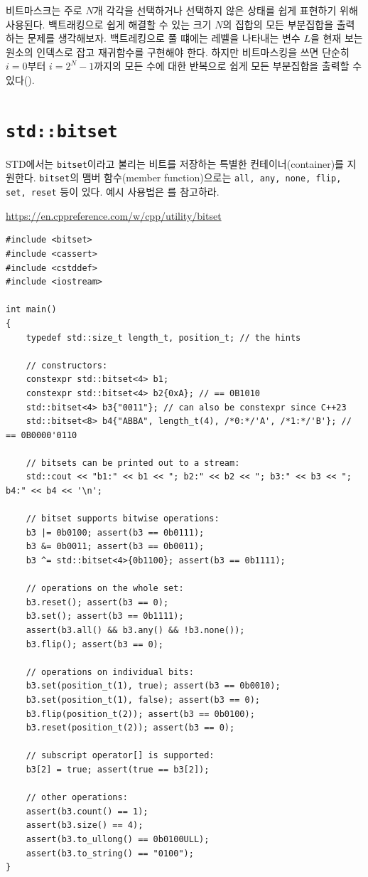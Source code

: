 비트마스크는 주로 $N$개 각각을 선택하거나 선택하지 않은 상태를 쉽게 표현하기 위해 사용된다. 백트래킹으로 쉽게 해결할 수 있는 크기 $N$의 집합의 모든 부분집합을 출력하는 문제를 생각해보자. 백트레킹으로 풀 떄에는 레벨을 나타내는 변수 $L$을 현재 보는 원소의 인덱스로 잡고 재귀함수를 구현해야 한다. 하지만 비트마스킹을 쓰면 단순히 $i=0$부터 $i=2^N-1$까지의 모든 수에 대한 반복으로 쉽게 모든 부분집합을 출력할 수 있다().

\section{\texttt{std::bitset}}
STD에서는 \texttt{bitset}이라고 불리는 비트를 저장하는 특별한 컨테이너(container)를 지원한다. \texttt{bitset}의 맴버 함수(member function)으로는 \texttt{all, any, none, flip, set, reset} 등이 있다. 예시 사용법은 를 참고하라.

\begin{code} \label{code: std-bitset}
\url{https://en.cppreference.com/w/cpp/utility/bitset}
\begin{lstlisting}
#include <bitset>
#include <cassert>
#include <cstddef>
#include <iostream>
 
int main()
{
    typedef std::size_t length_t, position_t; // the hints
 
    // constructors:
    constexpr std::bitset<4> b1;
    constexpr std::bitset<4> b2{0xA}; // == 0B1010
    std::bitset<4> b3{"0011"}; // can also be constexpr since C++23
    std::bitset<8> b4{"ABBA", length_t(4), /*0:*/'A', /*1:*/'B'}; // == 0B0000'0110
 
    // bitsets can be printed out to a stream:
    std::cout << "b1:" << b1 << "; b2:" << b2 << "; b3:" << b3 << "; b4:" << b4 << '\n';
 
    // bitset supports bitwise operations:
    b3 |= 0b0100; assert(b3 == 0b0111);
    b3 &= 0b0011; assert(b3 == 0b0011);
    b3 ^= std::bitset<4>{0b1100}; assert(b3 == 0b1111);
 
    // operations on the whole set:
    b3.reset(); assert(b3 == 0);
    b3.set(); assert(b3 == 0b1111);
    assert(b3.all() && b3.any() && !b3.none());
    b3.flip(); assert(b3 == 0);
 
    // operations on individual bits:
    b3.set(position_t(1), true); assert(b3 == 0b0010);
    b3.set(position_t(1), false); assert(b3 == 0);
    b3.flip(position_t(2)); assert(b3 == 0b0100);
    b3.reset(position_t(2)); assert(b3 == 0);
 
    // subscript operator[] is supported:
    b3[2] = true; assert(true == b3[2]);
 
    // other operations:
    assert(b3.count() == 1);
    assert(b3.size() == 4);
    assert(b3.to_ullong() == 0b0100ULL);
    assert(b3.to_string() == "0100");
}
\end{lstlisting}
\end{code}

